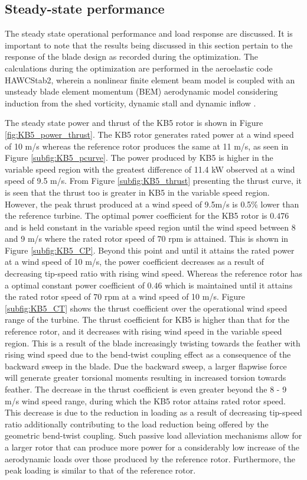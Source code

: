 \subsection{Steady-state performance}
The steady state operational performance and load response are discussed. It is important to note that the results being discussed in this section pertain to the response of the blade design as recorded during the optimization. The calculations during the optimization are performed in the aeroelastic code HAWCStab2, wherein a nonlinear finite element beam model is coupled with an unsteady blade element momentum (BEM) aerodynamic model considering induction from the shed vorticity, dynamic stall and dynamic inflow \cite{hawcstab2}.

The steady state power and thrust of the KB5 rotor is shown in Figure \ref{fig:KB5_power_thrust}. The KB5 rotor generates rated power at a wind speed of 10 m/s whereas the reference rotor produces the same at 11 m/s, as seen in Figure \ref{subfig:KB5_pcurve}. The power produced by KB5 is higher in the variable speed region with the greatest difference of 11.4 kW observed at a wind speed of 9.5 m/s. From Figure \ref{subfig:KB5_thrust} presenting the thrust curve, it is seen that the thrust too is greater in KB5 in the variable speed region. However, the peak thrust produced at a wind speed of 9.5m/s is 0.5\% lower than the reference turbine. The optimal power coefficient for the KB5 rotor is $0.476$ and is held constant in the variable speed region until the wind speed between 8 and 9 m/s where the rated rotor speed of $70$ rpm is attained. This is shown in Figure \ref{subfig:KB5_CP}. Beyond this point and until it attains the rated power at a wind speed of 10 m/s, the power coefficient decreases as a result of decreasing tip-speed ratio with rising wind speed. Whereas the reference rotor has a optimal constant power coefficient of $0.46$ which is maintained until it attains the rated rotor speed of $70$ rpm at a wind speed of 10 m/s. Figure \ref{subfig:KB5_CT} shows the thrust coefficient over the operational wind speed range of the turbine. The thrust coefficient for KB5 is higher than that for the reference rotor, and it decreases with rising wind speed in the variable speed region. This is a result of the blade increasingly twisting towards the feather with rising wind speed due to the bend-twist coupling effect as a consequence of the backward sweep in the blade. Due the backward sweep, a larger flapwise force will generate greater torsional moments resulting in increased torsion towards feather. The decrease in the thrust coefficient is even greater beyond the 8 - 9 m/s wind speed range, during which the KB5 rotor attains rated rotor speed. This decrease is due to the reduction in loading as a result of decreasing tip-speed ratio additionally contributing to the load reduction being offered by the geometric bend-twist coupling. Such passive load alleviation mechanisms allow for a larger rotor that can produce more power for a considerably low increase of the aerodynamic loads over those produced by the reference rotor. Furthermore, the peak loading is similar to that of the reference rotor.  

